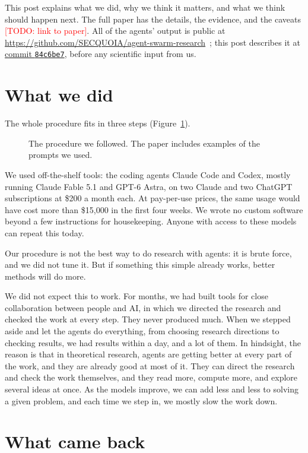 \documentclass[11pt]{article}
\newcommand{\todo}[1]{\textcolor{red}{[TODO: #1]}}
\newcommand{\corpusurl}{https://github.com/SECQUOIA/agent-swarm-research}
\newcommand{\corpusref}{84c6be7aad17d085e5343e789885c1cbcbbd4e07}
\newcommand{\corpussnapshot}{\href{\corpusurl/tree/\corpusref}{commit \texttt{84c6be7}}}
\begin{document}
This post explains what we did, why we think it matters, and what we think should happen next.
The full paper has the details, the evidence, and the caveats \todo{link to paper}.
All of the agents' output is public at \url{https://github.com/SECQUOIA/agent-swarm-research}~\citep{gusev2026corpus}; this post describes it at \corpussnapshot, before any scientific input from us.

\section*{What we did}

The whole procedure fits in three steps (Figure~\ref{fig:research-setup}).

\begin{figure}[ht]
  \centering
  
  \caption{The procedure we followed. The paper includes examples of the prompts we used.}
  \label{fig:research-setup}
\end{figure}

We used off-the-shelf tools: the coding agents Claude Code and Codex, mostly running Claude Fable 5.1 and GPT-6 Astra, on two Claude and two ChatGPT subscriptions at \$200 a month each.
At pay-per-use prices, the same usage would have cost more than \$15,000 in the first four weeks.
We wrote no custom software beyond a few instructions for housekeeping.
Anyone with access to these models can repeat this today.

Our procedure is not the best way to do research with agents: it is brute force, and we did not tune it.
But if something this simple already works, better methods will do more.

We did not expect this to work.
For months, we had built tools for close collaboration between people and AI, in which we directed the research and checked the work at every step.
They never produced much.
When we stepped aside and let the agents do everything, from choosing research directions to checking results, we had results within a day, and a lot of them.
In hindsight, the reason is that in theoretical research, agents are getting better at every part of the work, and they are already good at most of it.
They can direct the research and check the work themselves, and they read more, compute more, and explore several ideas at once.
As the models improve, we can add less and less to solving a given problem, and each time we step in, we mostly slow the work down.

\section*{What came back}
\end{document}
